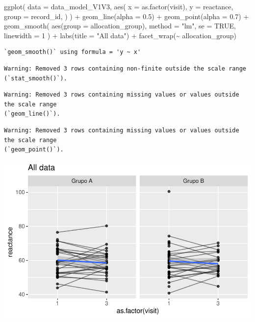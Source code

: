 \documentclass[
  letterpaper,
  DIV=11,
  numbers=noendperiod]{scrartcl}
\newenvironment{Shaded}{\begin{snugshade}}{\end{snugshade}}
\newcommand{\AttributeTok}[1]{\textcolor[rgb]{0.40,0.45,0.13}{#1}}
\newcommand{\ConstantTok}[1]{\textcolor[rgb]{0.56,0.35,0.01}{#1}}
\newcommand{\DecValTok}[1]{\textcolor[rgb]{0.68,0.00,0.00}{#1}}
\newcommand{\FloatTok}[1]{\textcolor[rgb]{0.68,0.00,0.00}{#1}}
\newcommand{\FunctionTok}[1]{\textcolor[rgb]{0.28,0.35,0.67}{#1}}
\newcommand{\NormalTok}[1]{\textcolor[rgb]{0.00,0.23,0.31}{#1}}
\newcommand{\SpecialCharTok}[1]{\textcolor[rgb]{0.37,0.37,0.37}{#1}}
\newcommand{\StringTok}[1]{\textcolor[rgb]{0.13,0.47,0.30}{#1}}
\begin{document}
\begin{Shaded}
\begin{Highlighting}[]
\FunctionTok{ggplot}\NormalTok{(}
    \AttributeTok{data =}\NormalTok{ data\_model\_V1V3, }
    \FunctionTok{aes}\NormalTok{(}
        \AttributeTok{x =} \FunctionTok{as.factor}\NormalTok{(visit),}
        \AttributeTok{y =}\NormalTok{ reactance,}
        \AttributeTok{group =}\NormalTok{ record\_id,}
\NormalTok{    )}
\NormalTok{) }\SpecialCharTok{+}
    \FunctionTok{geom\_line}\NormalTok{(}\AttributeTok{alpha =} \FloatTok{0.5}\NormalTok{) }\SpecialCharTok{+}
    \FunctionTok{geom\_point}\NormalTok{(}\AttributeTok{alpha =} \FloatTok{0.7}\NormalTok{) }\SpecialCharTok{+}
    \FunctionTok{geom\_smooth}\NormalTok{(}
        \FunctionTok{aes}\NormalTok{(}\AttributeTok{group =}\NormalTok{ allocation\_group),}
        \AttributeTok{method =} \StringTok{"lm"}\NormalTok{,}
        \AttributeTok{se =} \ConstantTok{TRUE}\NormalTok{,}
        \AttributeTok{linewidth =} \DecValTok{1}
\NormalTok{    ) }\SpecialCharTok{+}
    \FunctionTok{labs}\NormalTok{(}\AttributeTok{title =} \StringTok{"All data"}\NormalTok{) }\SpecialCharTok{+}
    \FunctionTok{facet\_wrap}\NormalTok{(}\SpecialCharTok{\textasciitilde{}}\NormalTok{ allocation\_group)}
\end{Highlighting}
\end{Shaded}

\begin{verbatim}
`geom_smooth()` using formula = 'y ~ x'
\end{verbatim}

\begin{verbatim}
Warning: Removed 3 rows containing non-finite outside the scale range
(`stat_smooth()`).
\end{verbatim}

\begin{verbatim}
Warning: Removed 3 rows containing missing values or values outside the scale range
(`geom_line()`).
\end{verbatim}

\begin{verbatim}
Warning: Removed 3 rows containing missing values or values outside the scale range
(`geom_point()`).
\end{verbatim}

\includegraphics{Outcomes_V1V2V3_files/figure-pdf/reactance_6-1.pdf}
\end{document}
